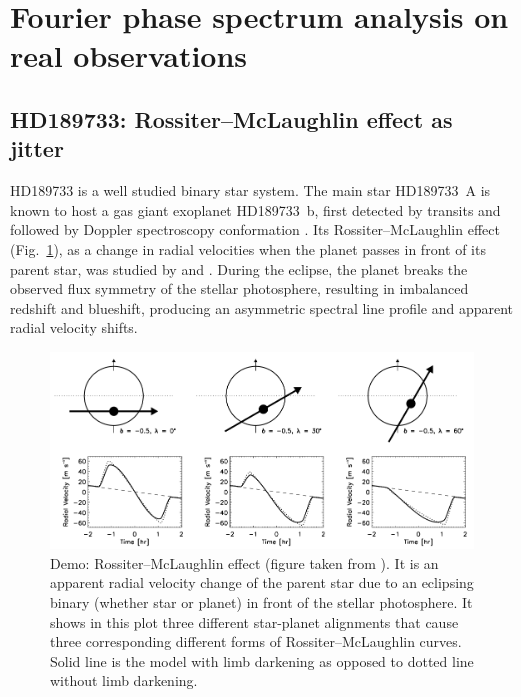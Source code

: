\pagebreak
\section{Fourier phase spectrum analysis on real observations}
\label{\thesection}
\label{sec:observation}

\subsection{HD189733: Rossiter–McLaughlin effect as jitter}
\label{sec:HD189733}

HD189733 is a well studied binary star system. The main star HD189733~A is known to host a gas giant exoplanet HD189733~b, first detected by transits and followed by Doppler spectroscopy conformation \cite{Bouchy2005ELODIE}. Its Rossiter–McLaughlin effect (Fig.~\ref{fig:rm-effect}), as a change in radial velocities when the planet passes in front of its parent star, was studied by \cite{Cochran2006} and \cite{Triaud2009}. During the eclipse, the planet breaks the observed flux symmetry of the stellar photosphere, resulting in imbalanced redshift and blueshift, producing an asymmetric spectral line profile and apparent radial velocity shifts.

\begin{figure}[htbp]
\centering
\includegraphics[width = 0.80 \linewidth]
{./Figures/Methods/rmeffect.png}
\caption[Demo: Rossiter–McLaughlin effect]
{Demo: Rossiter–McLaughlin effect (figure taken from \cite{Gaudi2007}). It is an apparent radial velocity change of the parent star due to an eclipsing binary (whether star or planet) in front of the stellar photosphere. It shows in this plot three different star-planet alignments that cause three corresponding different forms of Rossiter–McLaughlin curves. Solid line is the model with limb darkening as opposed to dotted line without limb darkening.}
\label{fig:rm-effect}
\end{figure} 

